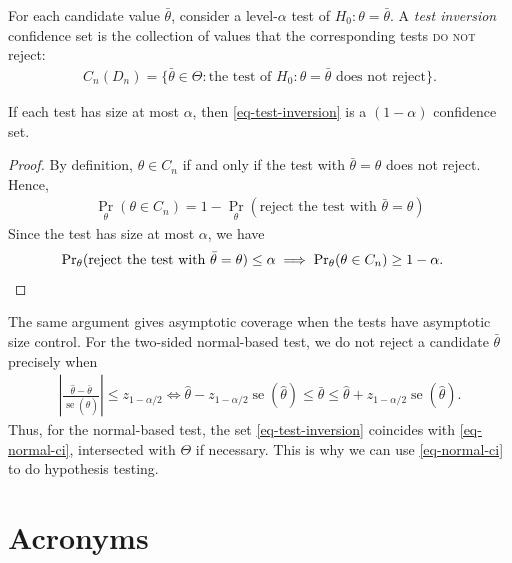 \documentclass[a4paper,12pt]{article}
\begin{document}
\begin{definition}\label{def-test-inversion}
	For each candidate value $\bar\theta$, consider a level-$\alpha$ test of $H_0:\theta=\bar\theta$.
	A \emph{test inversion} confidence set is the collection of values that the corresponding tests \textsc{do not} reject:
	\begin{align}\label{eq-test-inversion}
		C_n(D_n)=\{\bar\theta\in\Theta:
		\text{the test of }H_0:\theta=\bar\theta\text{ does not reject}\}.
	\end{align}
\end{definition}

\begin{theorem}
	If each test has size at most $\alpha$,
	then \eqref{eq-test-inversion} is a $(1-\alpha)$ confidence set.
\end{theorem}
\begin{proof}
	By definition, $\theta\in C_n$ if and only if the test with $\bar\theta=\theta$ does not reject.
	Hence,
	\begin{align*}
		\Pr_\theta(\theta\in C_n)
		=1-\Pr_\theta(\text{reject the test with }\bar\theta=\theta)
	\end{align*}
	Since the test has size at most $\alpha$, we have
	\begin{align*}
		\Pr_\theta(\text{reject the test with }\bar\theta=\theta)\le\alpha
		&\implies \Pr_\theta(\theta\in C_n)\ge1-\alpha.
		\qedhere
	\end{align*}
\end{proof}

\begin{remark}
	The same argument gives asymptotic coverage when the tests have asymptotic size control.
	For the two-sided normal-based test, we do not reject a candidate $\bar\theta$ precisely when
	\begin{align}
		\left|\frac{\widehat\theta-\bar\theta}{\operatorname{se}(\widehat\theta)}\right|
		\le z_{1-\alpha/2}
		\iff
		\widehat\theta-z_{1-\alpha/2}\operatorname{se}(\widehat\theta)
		\le\bar\theta\le
		\widehat\theta+z_{1-\alpha/2}\operatorname{se}(\widehat\theta).
	\end{align}
	Thus, for the normal-based test, the set \eqref{eq-test-inversion} coincides with \eqref{eq-normal-ci},
	intersected with $\Theta$ if necessary.
	This is why we can use \eqref{eq-normal-ci} to do hypothesis testing.
\end{remark}

\vfill
\section*{Acronyms}
\printglossaries
\end{document}
